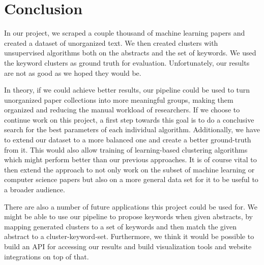 \section{Conclusion}
In our project, we scraped a couple thousand of machine learning papers and created a dataset of unorganized text. We then created clusters with unsupervised algorithms both on the abstracts and the set of keywords.
We used the keyword clusters as ground truth for evaluation. Unfortunately, our results are not as good as we hoped they would be.

In theory, if we could achieve better results, our pipeline could be used to turn unorganized paper collections into more meaningful groups, making them organized and reducing the manual workload of researchers.
If we choose to continue work on this project, a first step towards this goal is to do a conclusive search for the best parameters of each individual algorithm.
Additionally, we have to extend our dataset to a more balanced one and create a better ground-truth from it. This would also allow training of learning-based clustering algorithms which might perform better than our previous approaches.
It is of course vital to then extend the approach to not only work on the subset of machine learning or computer science papers but also on a more general data set for it to be useful to a broader audience.

There are also a number of future applications this project could be used for.
We might be able to use our pipeline to propose keywords when given abstracts, by mapping generated clusters to a set of keywords and then match the given abstract to a cluster-keyword-set.
Furthermore, we think it would be possible to build an API for accessing our results and build visualization tools and website integrations on top of that. 
